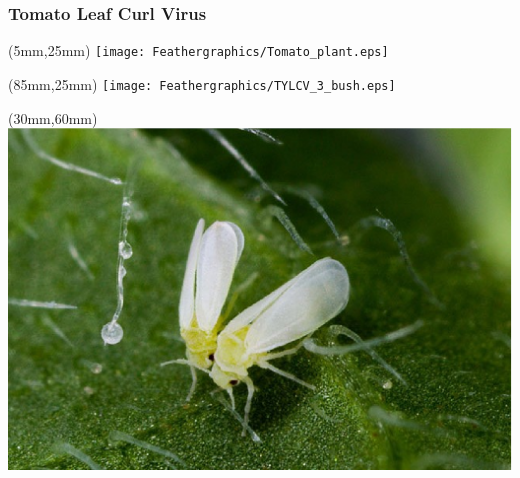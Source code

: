 \begin{frame}[plain]
	\frametitle{Tomato Leaf Curl Virus}
		\begin{textblock*}{40mm}(5mm,25mm)
			\texttt{[image: Feathergraphics/Tomato\_plant.eps]}
		\end{textblock*}
	
		\begin{textblock*}{30mm}(85mm,25mm)
			\texttt{[image: Feathergraphics/TYLCV\_3\_bush.eps]}
		\end{textblock*}
	{	
		\begin{textblock*}{45mm}(30mm,60mm)
			\includegraphics[width=\linewidth]{Feathergraphics/Mosca_Blanca.eps}
		\end{textblock*}
	}
\end{frame}
